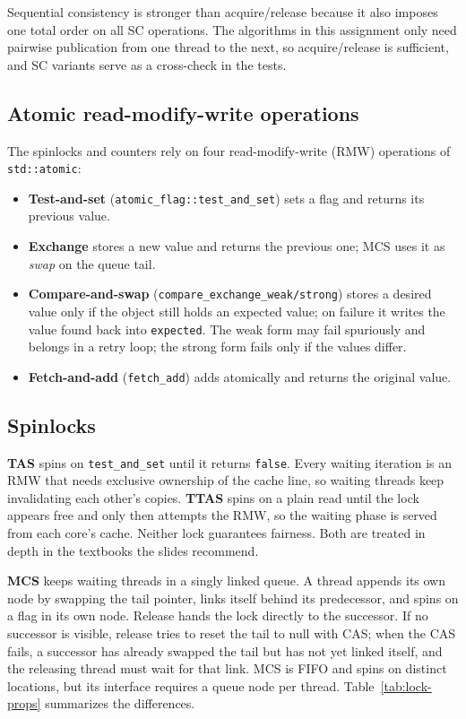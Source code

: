 Sequential consistency is stronger than acquire/release because it also imposes one total order on all SC operations. The algorithms in this assignment only need pairwise publication from one thread to the next, so acquire/release is sufficient, and SC variants serve as a cross-check in the tests.

\subsection{Atomic read-modify-write operations}

The spinlocks and counters rely on four read-modify-write (RMW) operations of \texttt{std::atomic}:

\begin{itemize}[leftmargin=1.5em]
  \item \textbf{Test-and-set} (\texttt{atomic\_flag::test\_and\_set}) sets a flag and returns its previous value.
  \item \textbf{Exchange} stores a new value and returns the previous one; MCS uses it as \emph{swap} on the queue tail.
  \item \textbf{Compare-and-swap} (\texttt{compare\_exchange\_weak/strong}) stores a desired value only if the object still holds an expected value; on failure it writes the value found back into \texttt{expected}. The weak form may fail spuriously and belongs in a retry loop; the strong form fails only if the values differ.
  \item \textbf{Fetch-and-add} (\texttt{fetch\_add}) adds atomically and returns the original value.
\end{itemize}

\subsection{Spinlocks}\label{sec:bg-locks}

\textbf{TAS} spins on \texttt{test\_and\_set} until it returns \texttt{false}. Every waiting iteration is an RMW that needs exclusive ownership of the cache line, so waiting threads keep invalidating each other's copies. \textbf{TTAS} spins on a plain read until the lock appears free and only then attempts the RMW, so the waiting phase is served from each core's cache. Neither lock guarantees fairness. Both are treated in depth in the textbooks the slides recommend\cite{r4,r5}.

\textbf{MCS}\cite{r3} keeps waiting threads in a singly linked queue. A thread appends its own node by swapping the tail pointer, links itself behind its predecessor, and spins on a flag in its own node. Release hands the lock directly to the successor. If no successor is visible, release tries to reset the tail to null with CAS; when the CAS fails, a successor has already swapped the tail but has not yet linked itself, and the releasing thread must wait for that link. MCS is FIFO and spins on distinct locations, but its interface requires a queue node per thread. Table~\ref{tab:lock-props} summarizes the differences.

